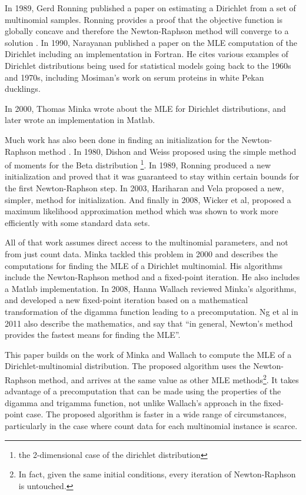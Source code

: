 \documentclass[twoside]{article}
\begin{document}
In 1989, Gerd Ronning published a paper on estimating a Dirichlet from a set of multinomial samples\cite{ronning}. Ronning provides a proof that the objective function is globally concave and therefore the Newton-Raphson method will converge to a solution \cite[pg 73]{ng}.  In 1990, Narayanan published a paper on the MLE computation of the Dirichlet including an implementation in Fortran\cite{narayanan}. He cites various examples of Dirichlet distributions being used for statistical models going back to the 1960s and 1970s, including Mosiman's work on serum proteins in white Pekan ducklings\cite[pg 8]{ng}.

In 2000, Thomas Minka\cite{minka} wrote about the MLE for Dirichlet distributions, and later wrote an implementation in Matlab.

Much work has also been done in finding an initialization for the Newton-Raphson method \cite[pg 74-54]{ng}.  In 1980, Dishon and Weiss\cite{dishon} proposed using the simple method of moments for the Beta distribution \footnote{the 2-dimensional case of the dirichlet distribution}.  In 1989, Ronning\cite{ronning} produced a new initialization and proved that it was guaranteed to stay within certain bounds for the first Newton-Raphson step.  In 2003, Hariharan and Vela\cite{hariharan} proposed a new, simpler, method for initialization.  And finally in 2008, Wicker et al\cite{wicker}, proposed a maximum likelihood approximation method which was shown to work more efficiently with some standard data sets.

All of that work assumes direct access to the multinomial parameters, and not from just count data.  Minka\cite{minka} tackled this problem in 2000 and describes the computations for finding the MLE of a Dirichlet multinomial.   His algorithms include the Newton-Raphson method and a fixed-point iteration.  He also includes a Matlab implementation.  In 2008, Hanna Wallach reviewed Minka's algorithms, and developed a new fixed-point iteration based on a mathematical transformation of the digamma function leading to a precomputation.  Ng et al\cite{ng} in 2011 also describe the mathematics, and say that ``in general, Newton's method provides the fastest means for finding the MLE''.

This paper builds on the work of Minka and Wallach to compute the MLE of a Dirichlet-multinomial distribution.  The proposed algorithm uses the Newton-Raphson method, and arrives at the same value as other MLE methods\footnote{In fact, given the same initial conditions, every iteration of Newton-Raphson is untouched.}.  It takes advantage of a precomputation that can be made using the properties of the digamma and trigamma function, not unlike Wallach's approach in the fixed-point case.  The proposed algorithm is faster in a wide range of circumstances, particularly in the case where count data for each multinomial instance is scarce.
\end{document}
